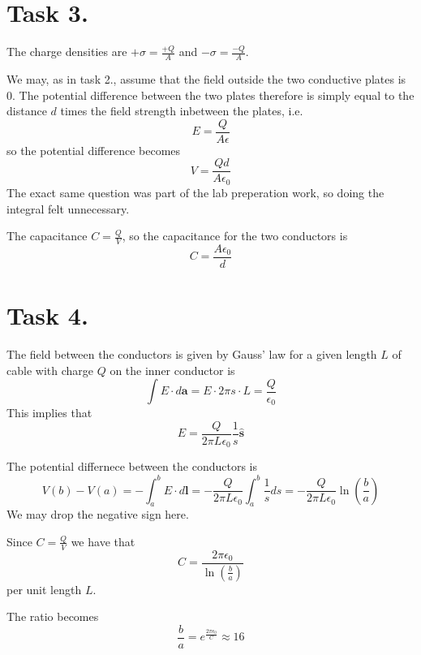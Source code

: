 \documentclass[a4paper,11pt]{article}
\begin{document}
\section*{Task 3.}
\begin{alphalist}
    \item The charge densities are $+\sigma = \frac{+Q}{A}$ and $-\sigma = \frac{-Q}{A}$.
    \item We may, as in task 2., assume that the field outside the two conductive plates is 0. The potential difference between the two plates
        therefore is simply equal to the distance $d$ times the field strength inbetween the plates, i.e.
        \[
            E = \frac{Q}{A\epsilon}
        \]
        so the potential difference becomes
        \[
            V = \frac{Qd}{A\epsilon_0}
        \]
        The exact same question was part of the lab preperation work, so doing the integral felt unnecessary.
    \item The capacitance $C = \frac{Q}{V}$, so the capacitance for the two conductors is
        \[
            C = \frac{A\epsilon_0}{d}
        \]
\end{alphalist}

\section*{Task 4.}
\begin{alphalist}
    \item The field between the conductors is given by Gauss' law for a given length $L$ of cable with charge $Q$ on the inner conductor is
        \[
            \int E \cdot d\mathbf{a} = E \cdot 2\pi s \cdot L = \frac{Q}{\epsilon_0}
        \] 
        This implies that 
        \[
            E = \frac{Q}{2\pi L \epsilon_0}\frac{1}{s} \mathbf{\hat{s}}
        \]
    \item The potential differnece between the conductors is 
        \[
            V(b) - V(a) = -\int_{a}^{b} E \cdot d\mathbf{l} = -\frac{Q}{2\pi L\epsilon_0} \int_{a}^{b}\frac{1}{s} ds = -\frac{Q}{2\pi L\epsilon_0} \ln\left(\frac{b}{a}\right)
        \]
        We may drop the negative sign here.
    \item Since $C = \frac{Q}{V}$ we have that
        \[
            C = \frac{2\pi\epsilon_0}{\ln\left(\frac{b}{a}\right)}
        \]
        per unit length $L$.
    \item The ratio becomes
        \[
            \frac{b}{a} = e^{\frac{2\pi\epsilon_0}{C}} \approx 16
        \]
\end{alphalist}
\end{document}
